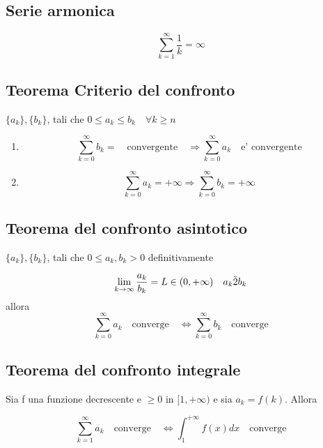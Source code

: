 \documentclass{article}
\begin{document}
          \subsection{Serie armonica}
          \begin{equation*}
            \sum^{\infty}_{k=1} \frac{1}{k} = \infty
          \end{equation*}
          \subsection{Teorema Criterio del confronto}
          \begin{flushleft}
            $\{ a_k \},\{b_k\}$, tali che $0 \leq a_k \leq b_k \quad \forall k \geq n$
          \end{flushleft}
          \begin{enumerate}
            \item 
              \begin{equation*}
                \sum^{\infty}_{k=0} b_k= \quad \text{convergente} \quad \Rightarrow \sum^{\infty}_{k=0} a_k \quad \text{e' convergente}
              \end{equation*}
            \item 
              \begin{equation*}
                \sum^{\infty}_{k=0}a_k=+\infty \Rightarrow \sum^{\infty}_{k=0} b_k = +\infty
              \end{equation*}
          \end{enumerate}
          \subsection{Teorema del confronto asintotico}
          \begin{flushleft}
            $\{ a_k \},\{b_k\}$, tali che $0 \leq a_k , b_k >0$ definitivamente
          \end{flushleft}
          \begin{equation*}
            \lim_{k\to \infty} \frac{a_k}{b_k} = L \in (0,+\infty) \quad a_k \Tilde 2b_k
          \end{equation*}
          allora
          \begin{equation*}
            \sum^{\infty}_{k=0} a_k \quad \text{converge} \quad \iff \sum^{\infty}_{k=0} b_k \quad \text{converge}
          \end{equation*}
          \subsection{Teorema del confronto integrale}
          \begin{flushleft}
            Sia f una funzione decrescente e $\geq 0$ in $[1,+\infty)$ e sia $a_k=f(k)$. Allora
          \end{flushleft}
          \begin{equation*}
            \sum^{\infty}_{k=1} a_k \quad \text{converge} \quad \iff \int^{+\infty}_1 f(x)dx \quad \text{converge}
          \end{equation*}
\end{document}
